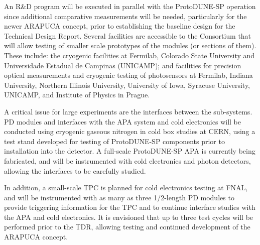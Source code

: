An R\&D program will be executed in parallel with the ProtoDUNE-SP operation since additional comparative measurements will be needed, particularly for the newer ARAPUCA concept, prior to establishing the baseline design for the Technical Design Report.
Several facilities are accessible to the Consortium that will allow testing of smaller scale prototypes of the modules (or sections of them). 
These include: the cryogenic facilities 
at Fermilab,  Colorado State University and Universidade Estadual de Campinas (UNICAMP); and facilities for precision optical measurements and cryogenic testing of photosensors at Fermilab, Indiana University, Northern Illinois University, University of Iowa, Syracuse University, UNICAMP, and Institute of Physics in Prague. 


A critical issue for large experiments are the interfaces between the sub-systems. PD modules and interfaces with the APA system and cold electronics will be conducted using cryogenic gaseous nitrogen in cold box studies at CERN, using a test stand developed for testing of ProtoDUNE-SP components prior to installation into the detector.  A full-scale ProtoDUNE-SP APA is currently being fabricated, and will be instrumented with cold electronics and photon detectors, allowing the interfaces to be carefully studied.

In addition, a small-scale TPC is planned for cold electronics testing at FNAL, and will be instrumented with as many as three 1/2-length PD modules to provide triggering information for the TPC and to continue interface studies with the APA and cold electronics.  It is envisioned that up to three test cycles will be performed prior to the TDR, allowing testing and continued development of the ARAPUCA concept.


